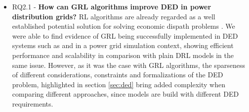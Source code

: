 \begin{itemize}
\begin{itemize}
		\item RQ2.1 - \textbf{How can \ac{GRL} algorithms improve \acf{DED} in power distribution grids?}  \ac{RL} algorithms are already regarded as a well established potential solution for solving economic dispath problems \cite{pereraApplicationsReinforcementLearning2021}. We were able to find evidence of \ac{GRL} being successfully implemented in \ac{DED} systems such as \cite{chenScalableGraphReinforcement2023} and \cite{liNovelGraphReinforcement2022} in a power grid simulation context, showing efficient performance and scalability in comparison with plain \ac{DRL} models in the same issue. However, as it was the case with \ac{GRL} algorithms, the sparseness of different considerations, constraints and formalizations of the \ac{DED} problem, highlighted in section \ref{sec:ded} bring added complexity when comparing different approaches, since models are build with different \ac{DED} requirements. 
	\end{itemize}
\end{itemize}




